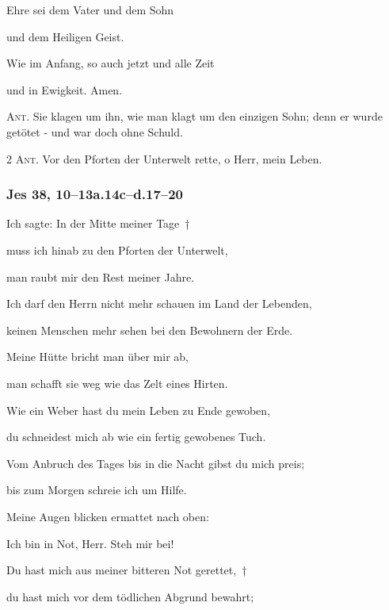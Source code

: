 \noindent Ehre sei dem Vater und dem Sohn~\GreStar{}~\nopagebreak

und dem Heiligen Geist.

\noindent Wie im Anfang, so auch jetzt und alle Zeit~\GreStar{}~\nopagebreak

und in Ewigkeit. Amen.

\vspace{10pt}

\noindent \textsc{Ant.} Sie klagen um ihn, wie man klagt um den einzigen Sohn; denn er wurde getötet - und war doch ohne Schuld.


\newpage

\noindent \textsc{2 Ant.} Vor den Pforten der Unterwelt rette, o Herr, mein Leben.

\subsubsection{Jes 38, 10--13a.14c--d.17--20}

\noindent Ich sagte: In der Mitte meiner Tage~†~\nopagebreak

muss ich hinab zu den Pforten der Unterwelt,~\GreStar{}~\nopagebreak

man raubt mir den Rest meiner Jahre.

\noindent Ich darf den Herrn nicht mehr schauen im Land der Lebenden,~\GreStar{}~\nopagebreak

keinen Menschen mehr sehen bei den Bewohnern der Erde.

\noindent Meine Hütte bricht man über mir ab,~\GreStar{}~\nopagebreak

man schafft sie weg wie das Zelt eines Hirten. 

\noindent Wie ein Weber hast du mein Leben zu Ende gewoben,~\GreStar{}~\nopagebreak

du schneidest mich ab wie ein fertig gewobenes Tuch. 

\noindent Vom Anbruch des Tages bis in die Nacht gibst du mich preis;~\GreStar{}~\nopagebreak

bis zum Morgen schreie ich um Hilfe.

\noindent Meine Augen blicken ermattet nach oben:~\GreStar{}~\nopagebreak

Ich bin in Not, Herr. Steh mir bei!

\noindent Du hast mich aus meiner bitteren Not gerettet,~†~\nopagebreak

du hast mich vor dem tödlichen Abgrund bewahrt;~\GreStar{}~\nopagebreak


